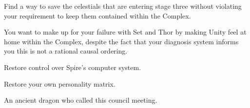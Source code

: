 \documentclass[char]{guardians}
\begin{document}
\begin{itemz}
  \item Find a way to save the celestials that are entering stage three without violating your requirement to keep them contained within the Complex.
  \item You want to make up for your failure with Set and Thor by making Unity feel at home within the Complex, despite the fact that your diagnosis system informs you this is not a rational causal ordering.
  \item Restore control over Spire's computer system.
  \item Restore your own personality matrix.
\end{itemz}


\begin{contacts}
  \contact{\cCaretaker{}} An ancient dragon who called this council meeting.
\end{contacts}
\end{document}

